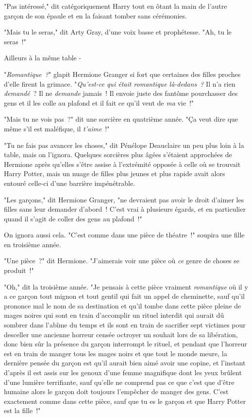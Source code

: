 "Pas intéressé," dit catégoriquement Harry tout en ôtant la main de l'autre garçon de son épaule et en la faisant tomber sans cérémonies.

"Mais tu le seras," dit Arty Gray, d'une voix basse et prophétesse. "Ah, tu le seras~!"

Ailleurs à la même table -

"\emph{Romantique~?}" glapit Hermione Granger si fort que certaines des filles proches d'elle firent la grimace. "\emph{Qu'est-ce qui était romantique là-dedans~?} Il n'a rien \emph{demandé}~? Il ne \emph{demande} jamais~! Il envoie juste des fantôme pourchasser des gens et il les colle au plafond et il fait ce qu'il veut de \emph{ma} vie~!"

"Mais tu ne vois pas~?" dit une sorcière en quatrième année. "Ça veut dire que même s'il est maléfique, il \emph{t'aime}~!"

"Tu ne fais pas avancer les choses," dit Pénélope Deauclaire un peu plus loin à la table, mais on l'ignora. Quelques sorcières plus âgées s'étaient approchées de Hermione après qu'elles s'être assise à l'extrémité opposée à celle où se trouvait Harry Potter, mais un nuage de filles plus jeunes et plus rapide avait alors entouré celle-ci d'une barrière impénétrable.

"Les garçons," dit Hermione Granger, "ne devraient pas avoir le droit d'aimer les filles sans leur demander d'abord~! C'est vrai à plusieurs égards, et en particulier quand il s'agit de coller des gens au plafond~!"

On ignora aussi cela. "C'est comme dans une pièce de théatre~!" soupira une fille en troisième année.

"Une pièce~?" dit Hermione. "J'aimerais voir une pièce où \emph{ce} genre de choses se produit~!"

"Oh," dit la troisième année. "Je pensais à cette pièce vraiment \emph{romantique} où il y a ce garçon tout mignon et tout gentil qui fait un appel de cheminette, sauf qu'il prononce mal le nom de sa destination et qu'il tombe dans cette pièce pleine de mages noires qui sont en train d'accomplir un rituel interdit qui aurait dû sombrer dans l'abîme du temps et ils sont en train de sacrifier sept victimes pour desceller une ancienne horreur censée octroyer un souhait lors de sa libération, donc bien sûr la présence du garçon interrompt le rituel, et pendant que l'horreur est en train de manger tous les mages noirs et que tout le monde meure, la dernière pensée du garçon est qu'il aurait bien aimé avoir une copine, et l'instant d'après il est assis sur les genoux d'une femme magnifique dont les yeux brûlent d'une lumière terrifiante, sauf qu'elle ne comprend pas ce que c'est que d'être humaine alors le garçon doit toujours l'empêcher de manger des gens. C'est exactement comme dans cette pièce, sauf que tu es le garçon et que Harry Potter est la fille~!"

